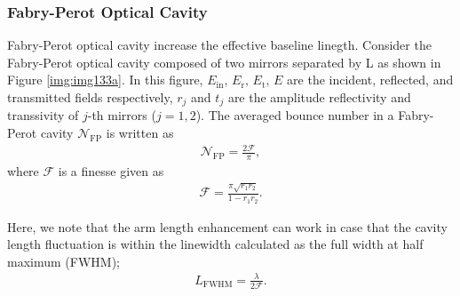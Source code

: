 \subsubsection{Fabry-Perot Optical Cavity}
Fabry-Perot optical cavity increase the effective baseline linegth. Consider the Fabry-Perot optical cavity composed of two mirrors separated by L as shown in Figure \ref{img:img133a}. In this figure, $E_{\mathrm{in}},\,E_{\mathrm{r}},\,E_{\mathrm{t}},\,E$ are the incident, reflected, and transmitted fields respectively, $r_{j}$ and $t_{j}$ are the amplitude reflectivity and transsivity of $j$-th mirrors ($j=1,2$). The averaged bounce number in a Fabry-Perot cavity $\mathcal{N}_{\mathrm{FP}}$ is written as \cite{ando1999power}
\begin{eqnarray}
  \mathcal{N}_{\mathrm{FP}} = \frac{2\mathcal{F}}{\pi},
\end{eqnarray}
where $\mathcal{F}$ is a finesse given as
\begin{eqnarray}
  \mathcal{F}=\frac{\pi \sqrt{r_{1} r_{2}}}{1-r_{1} r_{2}}.
\end{eqnarray}

Here, we note that the arm length enhancement can work in case that the cavity length fluctuation is within the linewidth calculated as the full width at half maximum (FWHM);
\begin{eqnarray}
  L_{\mathrm{FWHM}} = \frac{\lambda}{2\mathcal{F}}\label{eq:eq131}.
\end{eqnarray}


